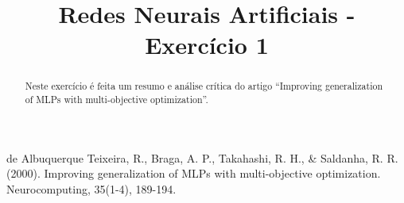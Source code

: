 \documentclass[conference]{IEEEtran}
\begin{document}
	
	\title{Redes Neurais Artificiais - Exercício 1}
	
	
	\author{
		}
	
	
	
	\maketitle
	
	\begin{abstract}
			
		Neste exercício é feita um resumo e análise crítica do artigo ``Improving generalization of MLPs with multi-objective optimization''.
		
	\end{abstract}


    \begin{thebibliography}{99}
         de Albuquerque Teixeira, R., Braga, A. P., Takahashi, R. H., \& Saldanha, R. R. (2000). Improving generalization of MLPs with multi-objective optimization. Neurocomputing, 35(1-4), 189-194.
    \end{thebibliography}
    
	
\end{document}
